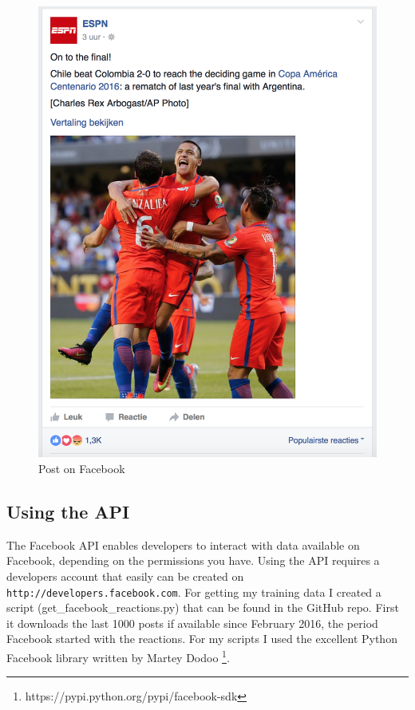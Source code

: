\documentclass[
10pt, %
a4paper, %
oneside, %
headinclude,footinclude, %
BCOR5mm, %
]{scrartcl}
\begin{document}
\begin{figure}
  \includegraphics[width=\linewidth]{facebook_post_football.png}
  \caption{Post on Facebook}
  \label{fig:facebook_reactions_post_football}
\end{figure}

\subsection{Using the API}
The Facebook API enables developers to interact with data available on Facebook, depending on the permissions you have. Using the API requires a developers account that easily can be created on \verb+http://developers.facebook.com+. For getting my training data I created a script (get\_facebook\_reactions.py) that can be found in the GitHub repo. First it downloads the last 1000 posts if available since February 2016, the period Facebook started with the reactions. For my scripts I used the excellent Python Facebook library written by Martey Dodoo \footnote{https://pypi.python.org/pypi/facebook-sdk}. 
\end{document}
